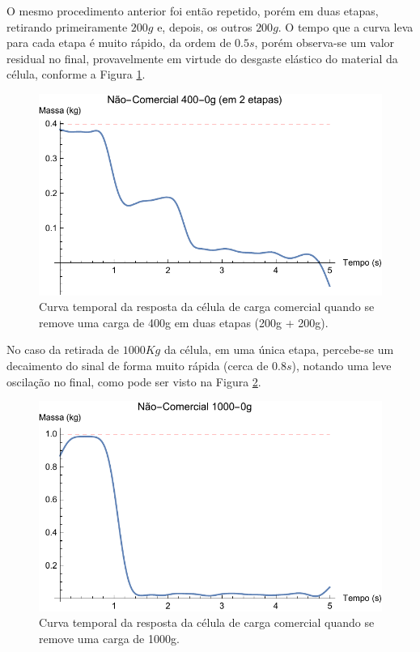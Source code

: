 \documentclass[a4paper]{instrumentacao}
\begin{document}
O mesmo procedimento anterior foi então repetido, porém em duas etapas, retirando primeiramente $200g$ e, depois, os outros $200g$. O tempo que a curva leva para cada etapa é muito rápido, da ordem de $0.5s$, porém observa-se um valor residual no final, provavelmente em virtude do desgaste elástico do material da célula, conforme a Figura \ref{fig:celula-nao-comercial-resultado-400-0g-etapa}.

\begin{figure}[H]
\center
\includegraphics[width=\textwidth]{NaoComercial_400g-0_etapa.pdf}
\caption{Curva temporal da resposta da célula de carga comercial quando se remove uma carga de 400g em duas etapas (200g + 200g).}
\label{fig:celula-nao-comercial-resultado-400-0g-etapa}
\end{figure}

No caso da retirada de $1000Kg$ da célula, em uma única etapa, percebe-se um decaimento do sinal de forma muito rápida (cerca de $0.8s$), notando uma leve oscilação no final, como pode ser visto na Figura \ref{fig:celula-nao-comercial-resultado-1000-0g}.

\begin{figure}[H]
\center
\includegraphics[width=\textwidth]{NaoComercial_1000g-0.pdf}
\caption{Curva temporal da resposta da célula de carga comercial quando se remove uma carga de 1000g.}
\label{fig:celula-nao-comercial-resultado-1000-0g}
\end{figure}
\end{document}
